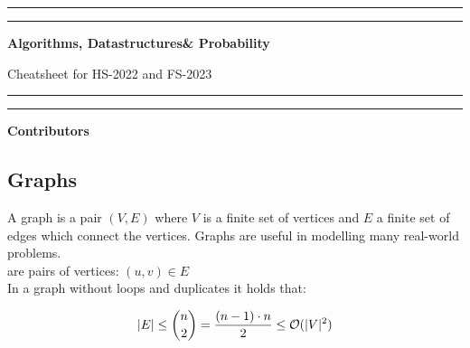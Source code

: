 \documentclass[a3paper, landscape, 11pt]{article} %
\begin{document}
\begin{multicols*}{4}{



\rule{\columnwidth}{0.4pt}\vspace*{-\baselineskip}\vspace{3.2pt} %
	\rule{\columnwidth}{1.6pt} %
\begin{center}
\textbf{\huge{Algorithms, Datastructures{\color{black!0}{,}}\& Probability}}

\vspace{12pt}
Cheatsheet for HS-2022 and FS-2023
\rule{\columnwidth}{0.4pt}\vspace*{-\baselineskip}\vspace{3.2pt} %
	\rule{\columnwidth}{1.6pt} %


\bigskip
\license

\vfill

{\large{\textbf{Contributors}}}

\smallskip



\end{center}



\newpage
{}
\subsection*{Graphs}
A graph is a pair $(V,E)$ where $V$ is a finite set of vertices and $E$ a finite set of edges which connect the vertices. Graphs are useful in modelling many real-world problems.\\

 are pairs of vertices: $(u,v) \in E$\\

In a graph without loops and duplicates it holds that:

$$
|E| \le \binom{n}{2} = \frac{(n-1) \cdot n}{2} \le \mathcal{O}(|V|^2) 
$$\\

}
\end{multicols*}
\end{document}
